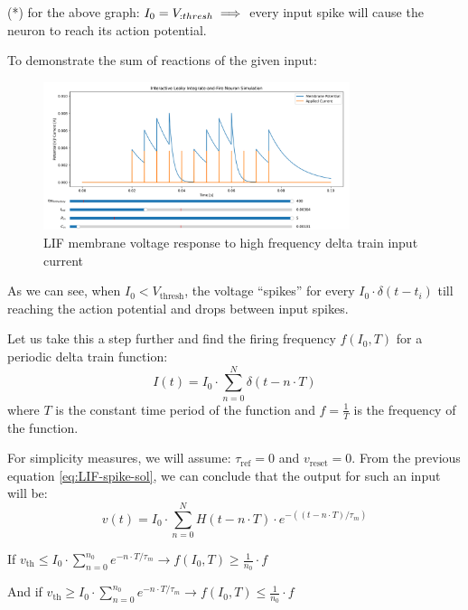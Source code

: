 (*) for the above graph: \( I_0=V_{\text: thresh} \implies \) every input spike will cause the neuron to reach its action potential.

To demonstrate the sum of reactions of the given input:

\begin{figure}[H]
    \centering
    \includegraphics[width=0.8\textwidth]{scientific-background/computational-models/LIF/graphs/LIF-high-freq-spike-response-ref.png}
    \caption{LIF membrane voltage response to high frequency delta train input current}
    \label{fig:LIF-high-freq-spike-ref}
\end{figure}

As we can see, when \(I_0 < V_{\text{thresh}}\), the voltage “spikes” for every \(I_0 \cdot \delta(t-t_i)\) till reaching the action potential and drops between input spikes. 

Let us take this a step further and find the firing frequency \(f(I_0, T)\) for a periodic delta train function:
\begin{equation}
I(t) = I_0 \cdot \sum_{n=0}^N \delta(t-n \cdot T)
\end{equation}
where \(T\) is the constant time period of the function and \(f = \frac{1}{T}\) is the frequency of the function.

For simplicity measures, we will assume: \(\tau_{\text{ref}} = 0\) and \(v_{\text{reset}} = 0\).
From the previous equation \ref{eq:LIF-spike-sol}, we can conclude that the output for such an input will be:
\begin{equation}
v(t) = I_0 \cdot \sum_{n=0}^N H(t-n \cdot T) \cdot e^{-((t-n \cdot T)/\tau_m)}
\end{equation}

If \(v_{\text{th}} \leq I_0 \cdot \sum_{n=0}^{n_0} e^{-n \cdot T/\tau_m} \rightarrow f(I_0, T) \geq \frac{1}{n_0} \cdot f\)

And if \(v_{\text{th}} \geq I_0 \cdot \sum_{n=0}^{n_0} e^{-n \cdot T/\tau_m} \rightarrow f(I_0, T) \leq \frac{1}{n_0} \cdot f\)

